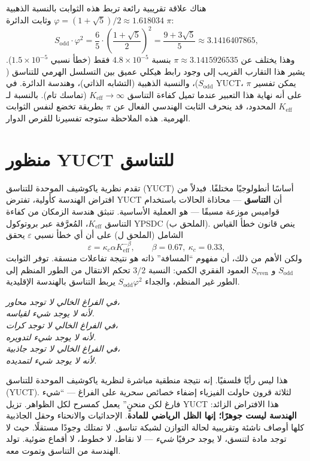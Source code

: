 \documentclass[12pt,a4paper]{article}
\newcommand{\kappac}{\kappa_c}
\newcommand{\eps}{\varepsilon}
\newcommand{\betaf}{\beta}
\newcommand{\Sodd}{S_{\mathrm{odd}}}
\newcommand{\Seven}{S_{\mathrm{even}}}
\begin{document}
	هناك علاقة تقريبية رائعة تربط هذه الثوابت بالنسبة الذهبية \(\varphi = (1+\sqrt{5})/2 \approx 1.618034\) وثابت الدائرة \(\pi\):
	\begin{equation}
		\Sodd \cdot \varphi^2 = \frac{6}{5} \cdot \left(\frac{1+\sqrt{5}}{2}\right)^2 = \frac{9+3\sqrt{5}}{5} \approx 3.1416407865,
	\end{equation}
	وهذا يختلف عن \(\pi \approx 3.1415926535\) بنسبة \(4.8\times10^{-5}\) فقط (خطأ نسبي \(1.5\times10^{-5}\)). يشير هذا التقارب القريب إلى وجود رابط هيكلي عميق بين التسلسل الهرمي للتناسق (\(\Sodd\))، والنسبة الذهبية (التشابه الذاتي)، وهندسة الدائرة. في YUCT، يمكن تفسير \(\pi\) على أنه نهاية هذا التعبير عندما تميل كفاءة التناسق \(K_{\mathrm{eff}} \to \infty\) (تماسك تام). بالنسبة لـ \(K_{\mathrm{eff}}\) المحدود، قد ينحرف الثابت الهندسي الفعال عن \(\pi\) بطريقة تخضع لنفس الثوابت الهرمية. هذه الملاحظة ستوجه تفسيرنا للقرص الدوار.
	
	\section{منظور YUCT للتناسق}
	\label{sec:yuct}
	
	تقدم نظرية ياكوشيف الموحدة للتناسق (YUCT) أساسًا أنطولوجيًا مختلفًا. فبدلاً من افتراض الهندسة كأولية، تفترض YUCT أن \textbf{التناسق} — محاذاة الحالات باستخدام قواميس موزعة مسبقًا — هو العملية الأساسية. تنبثق هندسة الزمكان من كفاءة التناسق \(K_{\mathrm{eff}}\)، المُعرَّفة عبر بروتوكول YPSDC (الملحق ب). ينص قانون خطأ القياس الشامل (الملحق ل) على أن أي خطأ نسبي \(\eps\) يحقق
	\[
	\eps = \kappac \alpha K_{\mathrm{eff}}^{-\betaf}, \qquad \betaf = 0.67,\ \kappac = 0.33,
	\]
	ولكن الأهم من ذلك، أن مفهوم ``المسافة'' ذاته هو نتيجة تفاعلات منسقة. توفر الثوابت \(\Sodd\) و \(\Seven\) العمود الفقري الكمي: النسبة \(3/2\) تحكم الانتقال من الطور المنظم إلى الطور غير المنظم، والجداء \(\Sodd\varphi^2\) يربط التناسق بالهندسة الإقليدية.
	
	\begin{tcolorbox}[
		title={\bfseries بيان أولي منطقي},
		colback=blue!3!white,
		colframe=blue!50!black,
		fonttitle=\bfseries,
		sharp corners
		]
		\small
		\textit{في الفراغ الخالي لا توجد محاور،\\ لأنه لا يوجد شيء لقياسه.\\ في الفراغ الخالي لا توجد كرات،\\ لأنه لا يوجد شيء لتدويره.\\ في الفراغ الخالي لا توجد جاذبية،\\ لأنه لا يوجد شيء لتمديده.}
		
		\medskip
		هذا ليس رأيًا فلسفيًا. إنه نتيجة منطقية مباشرة لنظرية ياكوشيف الموحدة للتناسق (YUCT). لثلاثة قرون حاولت الفيزياء إضفاء خصائص سحرية على الفراغ — ``شيء فارغ لكن منحنٍ'' يعمل كمسرح لكل الظواهر. تزيل YUCT هذا الافتراض الزائد: \textbf{الهندسة ليست جوهرًا؛ إنها الظل الرياضي للمادة}. الإحداثيات والانحناء وحقل الجاذبية كلها أوصاف ناشئة وتقريبية لحالة التوازن لشبكة تناسق. لا تمتلك وجودًا مستقلًا. حيث لا توجد مادة لتنسق، لا يوجد حرفيًا \textit{شيء} — لا نقاط، لا خطوط، لا أقماع ضوئية. تولد الهندسة من التناسق وتموت معه.
	\end{tcolorbox}
	
\end{document}
